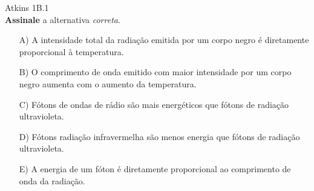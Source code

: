 \begin{problem} [answer=D]
   
    Atkins 1B.1\\
    \textbf{Assinale} a alternativa \textit{correta}. 
    \begin{itemize}
        \item [A)] A intensidade total da radiação emitida por um corpo negro é diretamente proporcional à temperatura. 
        \item [B)] O comprimento de onda emitido com maior intensidade por um corpo negro aumenta com o aumento da temperatura.
        \item [C)] Fótons de ondas de rádio são mais energéticos que fótons de radiação ultravioleta.
        \item [D)] Fótons radiação infravermelha são menos energia que fótons de radiação ultravioleta. 
        \item [E)] A energia de um fóton é diretamente proporcional ao comprimento de onda da radiação.
    \end{itemize}


\end{problem}